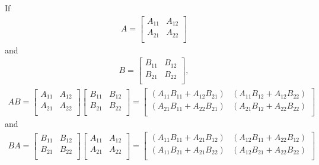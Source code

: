 \documentclass[12pt]{article}
\begin{document}
\begin{enumerate}
    If
    \begin{align*}
      A =
      \begin{bmatrix}
        A_{11} & A_{12}\\
        A_{21} & A_{22}\\
      \end{bmatrix}
    \end{align*}
    and
    \begin{align*}
      B =
      \begin{bmatrix}
        B_{11} & B_{12}\\
        B_{21} & B_{22}\\
      \end{bmatrix},
    \end{align*}
    \begin{align*}
      AB =
      \begin{bmatrix}
        A_{11} & A_{12}\\
        A_{21} & A_{22}\\
      \end{bmatrix}
      \begin{bmatrix}
        B_{11} & B_{12}\\
        B_{21} & B_{22}\\
      \end{bmatrix}
      =
      \begin{bmatrix}
        (A_{11}B_{11} + A_{12}B_{21}) &
        (A_{11}B_{12} + A_{12}B_{22})\\
        (A_{21}B_{11} + A_{22}B_{21}) &
        (A_{21}B_{12} + A_{22}B_{22})\\
      \end{bmatrix}
    \end{align*}
    and
    \begin{align*}
      BA =
      \begin{bmatrix}
        B_{11} & B_{12}\\
        B_{21} & B_{22}\\
      \end{bmatrix}
      \begin{bmatrix}
        A_{11} & A_{12}\\
        A_{21} & A_{22}\\
      \end{bmatrix}
      =
      \begin{bmatrix}
        (A_{11}B_{11} + A_{21}B_{12}) &
        (A_{12}B_{11} + A_{22}B_{12})\\
        (A_{11}B_{21} + A_{21}B_{22}) &
        (A_{12}B_{21} + A_{22}B_{22})\\

\end{bmatrix}
\end{align*}
\end{enumerate}
\end{document}
